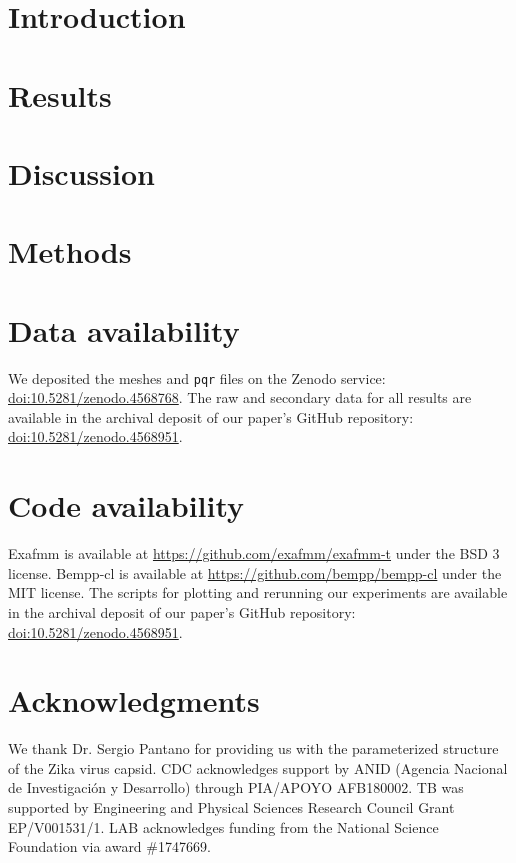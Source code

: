 \documentclass[twocolumn]{article}
\begin{document}
\section{Introduction}\label{sec:intro}


\section{Results}\label{sec:results}


\section{Discussion} \label{sec:discussion}


\small{
\section{Methods}\label{sec:methods}



}

\section{Data availability}
We deposited the meshes and \texttt{pqr} files on the Zenodo service: \href{http://doi.org/10.5281/zenodo.4568768}{doi:10.5281/zenodo.4568768}.
The raw and secondary data for all results are available in the archival deposit of our paper’s GitHub repository: \href{http://doi.org/10.5281/zenodo.4568951}{doi:10.5281/zenodo.4568951}.

\section{Code availability}
Exafmm is available at \href{https://github.com/exafmm/exafmm-t}{https://github.com/exafmm/exafmm-t} under the BSD 3 license.
Bempp-cl is available at \href{https://github.com/bempp/bempp-cl}{https://github.com/bempp/bempp-cl} under the MIT license.
The scripts for plotting and rerunning our experiments are available in the archival deposit of our paper’s GitHub repository: \href{http://doi.org/10.5281/zenodo.4568951}{doi:10.5281/zenodo.4568951}.

{}


\section*{Acknowledgments}
We thank Dr. Sergio Pantano for providing us with the parameterized structure of the Zika virus capsid.
CDC acknowledges support by ANID (Agencia Nacional de Investigaci\'{o}n y Desarrollo) through PIA/APOYO AFB180002.
TB was supported by Engineering and Physical Sciences Research Council Grant EP/V001531/1.
LAB acknowledges funding from the National Science Foundation via award \#1747669.
\end{document}
